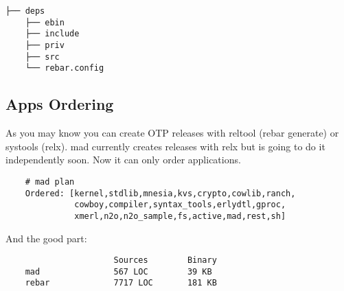 \vspace{1\baselineskip}
\begin{lstlisting}[caption=OTP Application]
    ├── deps
    ├── ebin
    ├── include
    ├── priv
    ├── src
    └── rebar.config
\end{lstlisting}
\vspace{1\baselineskip}

\subsection{Apps Ordering}

As you may know you can create OTP releases with
reltool (rebar generate) or systools (relx). mad currently
creates releases with relx but is going to do it independently soon.
Now it can only order applications.

\vspace{1\baselineskip}
\begin{lstlisting}
    # mad plan
    Ordered: [kernel,stdlib,mnesia,kvs,crypto,cowlib,ranch,
              cowboy,compiler,syntax_tools,erlydtl,gproc,
              xmerl,n2o,n2o_sample,fs,active,mad,rest,sh]
\end{lstlisting}
\vspace{1\baselineskip}

And the good part:

\vspace{1\baselineskip}
\begin{lstlisting}
                      Sources        Binary
    mad               567 LOC        39 KB
    rebar             7717 LOC       181 KB
\end{lstlisting}
\vspace{1\baselineskip}
